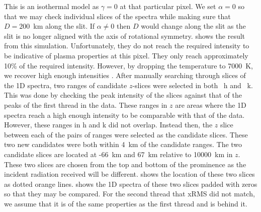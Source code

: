 This is an isothermal model as $\gamma=0$ at that particular pixel. We set $\alpha=0$ so that we may check individual slices of the spectra while making sure that $D=200$~km along the slit. If $\alpha\neq0$ then $D$ would change along the slit as the slit is no longer aligned with the axis of rotational symmetry.  shows the result from this simulation. Unfortunately, they do not reach the required intensity  to be indicative of plasma properties at this pixel. They only reach approximately 10\% of the required intensity. However, by dropping the temperature to 7000~K, we recover high enough intensities . After manually searching through slices of the 1D spectra, two ranges of candidate $z$-slices were selected in both \mgii~h and \mgii~k. This was done by checking the peak intensity of the slices against that of the peaks of the first thread in the data. These ranges in $z$ are areas where the 1D spectra reach a high enough intensity to be comparable with that of the data. However, these ranges in h and k did not overlap. Instead then, the $z$ slice between each of the pairs of ranges were selected as the candidate slices. These two new candidates were both within 4~km of the candidate ranges. The two candidate slices are located at -66~km and 67~km relative to 10000~km in $z$. These two slices are chosen from the top and bottom of the prominence as the incident radiation received will be different.  shows the location of these two slices as dotted orange lines.  shows the 1D spectra of these two slices padded with zeros so that they may be compared. For the second thread that xRMS did not match, we assume that it is of the same properties as the first thread and is behind it.
